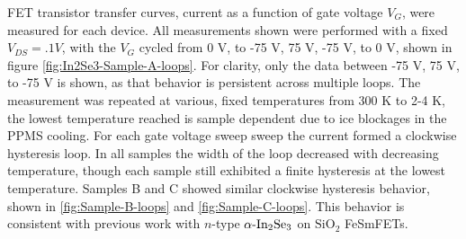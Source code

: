 FET transistor transfer curves, current as a function of gate voltage
$V_{G}$, were measured for each device. All measurements shown were
performed with a fixed $V_{DS}=.1V$, with the $V_{G}$ cycled from
0 V, to -75 V, 75 V, -75 V, to 0 V, shown in figure \ref{fig:In2Se3-Sample-A-loops}.
For clarity, only the data between -75 V, 75 V, to -75 V is shown,
as that behavior is persistent across multiple loops. The measurement
was repeated at various, fixed temperatures from 300 K to 2-4 K, the
lowest temperature reached is sample dependent due to ice blockages
in the PPMS cooling. For each gate voltage sweep sweep the current
formed a clockwise hysteresis loop. In all samples the width of the
loop decreased with decreasing temperature, though each sample still
exhibited a finite hysteresis at the lowest temperature. Samples B
and C showed similar clockwise hysteresis behavior, shown in \ref{fig:Sample-B-loops}
and \ref{fig:Sample-C-loops}. This behavior is consistent with previous
work with $n$-type $\textrm{\ensuremath{\alpha}-In}_{2}\textrm{Se}_{3}$
on $\textrm{Si}\textrm{O}_{2}$ FeSmFETs.\citep{si2019aferroelectric} 

